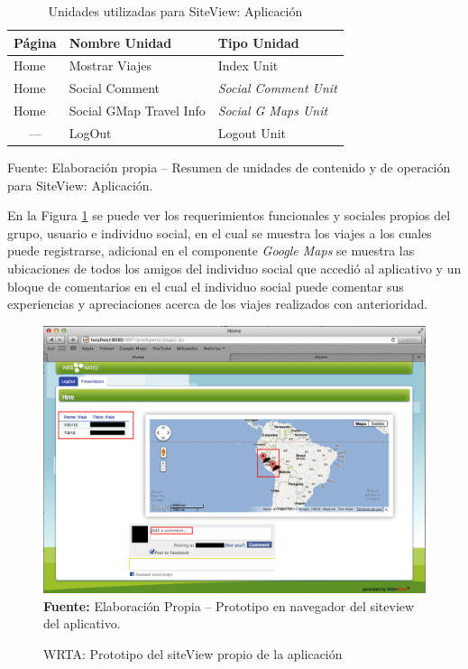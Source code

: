 \documentclass[oneside,12pt,a4paper]{memoir}%
\begin{document}
			\begin{table}[htbp]
			\centering
			\caption{Unidades utilizadas para SiteView: Aplicaci\'on}
				\begin{tabular}{|l|l|l|}
					\hline
					\textbf{P\'agina}	&	\textbf{Nombre Unidad}	&	\textbf{Tipo Unidad}\\\hline 
					Home				&	Mostrar Viajes			&	Index Unit\\\hline
					Home				&	Social Comment			&	\textit{Social Comment Unit}\\\hline 
					Home				&	Social GMap Travel Info	&	\textit{Social G Maps Unit}\\\hline 
					\multicolumn{1}{|c|}{---}&	LogOut				&	Logout Unit	\\\hline
				\end{tabular}
			\newline
			Fuente: Elaboraci\'on propia -- Resumen de unidades de contenido y de
			operaci\'on para SiteView: Aplicaci\'on.
			\label{tab:svAplicacion}
			\end{table}
 
			En la Figura \ref{fig:WRTA_paginaAplicacion} se puede ver los
			requerimientos funcionales y sociales propios del grupo, usuario e
			individuo social, en el cual se muestra los viajes a los cuales puede
			registrarse, adicional en el componente \textit{Google Maps} se muestra las
			ubicaciones de todos los amigos del individuo social que accedi\'o al
			aplicativo y un bloque de comentarios en el cual el individuo social puede comentar sus
			experiencias y apreciaciones acerca de los viajes realizados con
			anterioridad.

			
			\begin{figure}[here]
				\centering
				\caption{WRTA: Prototipo del siteView propio de la aplicaci\'on}
				\includegraphics[width=1.0\textwidth]{figure/fig_WRTA_Aplicacion.png}
				\newline
				\textbf{Fuente:} Elaboraci\'on Propia -- Prototipo en navegador del
				siteview del aplicativo.
				\label{fig:WRTA_paginaAplicacion}
			\end{figure}
				
\end{document}
